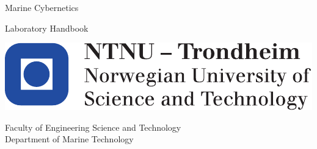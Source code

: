 \documentclass[a4paper,english]{report}
\begin{document}
\thispagestyle{empty}

\vspace*{3cm}

\begin{center}
{\LARGE{}Marine Cybernetics}
\par\end{center}{\LARGE \par}

\begin{center}
{\LARGE{}Laboratory Handbook }
\par\end{center}{\LARGE \par}

\begin{flushleft}
\vfill{}
\par\end{flushleft}

\begin{flushleft}
\includegraphics[scale=0.6]{fig/NTNU_logo.pdf}
\par\end{flushleft}

Faculty of Engineering Science and Technology\\
Department of Marine Technology
\end{document}
